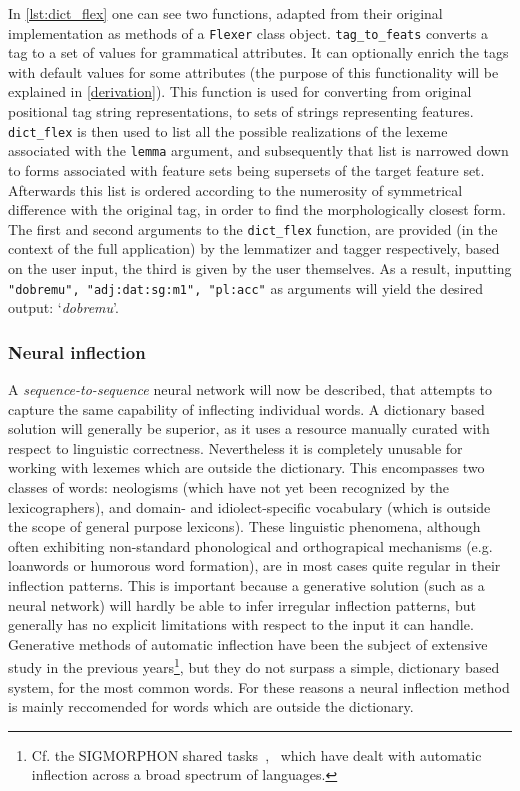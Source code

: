 \documentclass[12pt]{article}
\newcommand{\inlinegloss}[1]{`\textit{#1}'}
\begin{document}
In \autoref{lst:dict_flex} one can see two functions, adapted from their original implementation as methods of a \texttt{Flexer} class object. \texttt{tag_to_feats} converts a tag to a set of values for grammatical attributes. It can optionally enrich the tags with default values for some attributes (the purpose of this functionality will be explained in \autoref{derivation}). This function is used for converting from original positional tag string representations, to sets of strings representing features. \texttt{dict_flex} is then used to list all the possible realizations of the lexeme associated with the \texttt{lemma} argument, and subsequently that list is narrowed down to forms associated with feature sets being supersets of the target feature set. Afterwards this list is ordered according to the numerosity of symmetrical difference with the original tag, in order to find the morphologically closest form. The first and second arguments to the \texttt{dict_flex} function, are provided (in the context of the full application) by the lemmatizer and tagger respectively, based on the user input, the third is given by the user themselves. As a result, inputting \texttt{"dobremu", "adj:dat:sg:m1", "pl:acc"} as arguments will yield the desired output: \inlinegloss{dobremu}.

\subsubsection{Neural inflection}
A \textit{sequence-to-sequence} neural network will now be described, that attempts to capture the same capability of inflecting individual words. A dictionary based solution will generally be superior, as it uses a resource manually curated with respect to linguistic correctness. Nevertheless it is completely unusable for working with lexemes which are outside the dictionary. This encompasses two classes of words: neologisms (which have not yet been recognized by the lexicographers), and domain- and idiolect-specific vocabulary (which is outside the scope of general purpose lexicons). These linguistic phenomena, although often exhibiting non-standard phonological and orthograpical mechanisms (e.g. loanwords or humorous word formation), are in most cases quite regular in their inflection patterns. This is important because a generative solution (such as a neural network) will hardly be able to infer irregular inflection patterns, but generally has no explicit limitations with respect to the input it can handle.  Generative methods of automatic inflection have been the subject of extensive study in the previous years\footnote{Cf. the SIGMORPHON shared tasks~\cite{cotterell-etal-2018-conll},~\cite{cotterell-etal-2017-conll} which have dealt with automatic inflection across a broad spectrum of languages.}, but they do not surpass a simple, dictionary based system, for the most common words. For these reasons a neural inflection method is mainly reccomended for words which are outside the dictionary.
\end{document}
